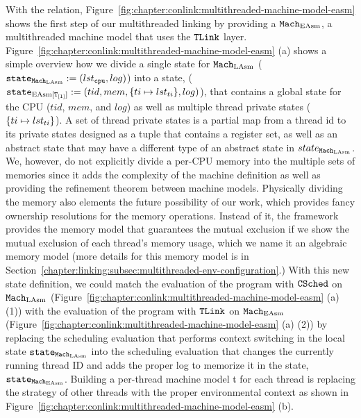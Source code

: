 With the relation, 
Figure~\ref{fig:chapter:conlink:multithreaded-machine-model-easm} shows
the first step of our multithreaded linking by providing 
a ${\mathrm{\texttt{Mach}}}_{\mathrm{EAsm}}$, a multithreaded machine model that uses the ${{\mathrm{\texttt{TLink}}}}$ layer.
Figure~\ref{fig:chapter:conlink:multithreaded-machine-model-easm} (a)
shows a simple overview how we divide a single state for ${\mathrm{\texttt{Mach}}}_{\mathrm{LAsm}}$  (${\mathrm{\texttt{state}}}_{{\mathrm{\texttt{Mach}}}_{\mathrm{LAsm}}} := (lst_{{\mathrm{\texttt{cpu}}}}, log)$)
into a state, (${\mathrm{\texttt{state}}}_{\mathrm{EAsm}[{{\mathrm{\texttt{T}}}_{[1]}}]} := (tid, mem, \{ti \mapsto lst_{ti}\}, log)$),
that contains a global state for the CPU ($tid$, $mem$, and $log$) as well as 
multiple thread private states ($\{ti \mapsto lst_{ti}\}$).
A set of thread private states is a partial map from a thread id to its private states designed as a tuple that contains
a register set, as well as an abstract state that may have a different type of an abstract state in $state_{{\mathrm{\texttt{Mach}}}_{\mathrm{LAsm}}}$. 
We, however, do not explicitly divide a per-CPU memory into the multiple sets of memories since 
it adds the complexity of the machine definition as well as providing the 
refinement theorem between machine models.
Physically dividing the memory also elements the future possibility of our work, which provides fancy ownership resolutions
for the memory operations.
Instead of it, the framework provides the memory model 
that guarantees the mutual exclusion if we show the mutual exclusion of each thread's memory usage, which we name it an algebraic memory model (more details for this memory model is in Section~\ref{chapter:linking:subsec:multithreaded-env-configuration}.)
With this new state definition, 
we could match the evaluation of the program with ${{\mathrm{\texttt{CSched}}}}$ on ${\mathrm{\texttt{Mach}}}_{\mathrm{LAsm}}$ (Figure~\ref{fig:chapter:conlink:multithreaded-machine-model-easm} (a) (1)) with  the evaluation of the program with ${{\mathrm{\texttt{TLink}}}}$ on ${\mathrm{\texttt{Mach}}}_{\mathrm{EAsm}}$
(Figure~\ref{fig:chapter:conlink:multithreaded-machine-model-easm} (a) (2)) 
by replacing the scheduling evaluation that performs context switching in the local state ${\mathrm{\texttt{state}}}_{{\mathrm{\texttt{Mach}}}_{\mathrm{LAsm}}}$
into  the scheduling evaluation that changes the currently running thread ID and 
adds the proper log to memorize it in the state, ${\mathrm{\texttt{state}}}_{{\mathrm{\texttt{Mach}}}_{\mathrm{EAsm}}}$.
Building a per-thread machine model t for each thread 
is replacing the strategy of other threads with the proper environmental context as shown in Figure~\ref{fig:chapter:conlink:multithreaded-machine-model-easm} (b).

